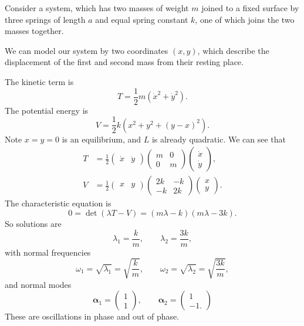 \documentclass[12pt]{article}
\begin{document}
\begin{exbox}
	Consider a system, which has two masses of weight $m$ joined to a fixed surface by three springs of length $a$ and equal spring constant $k$, one of which joins the two masses together.

	We can model our system by two coordinates $(x, y)$, which describe the displacement of the first and second mass from their resting place.

	The kinetic term is
	\[
	T = \frac{1}{2} m(\dot x^2 + \dot y^2).
	\]
	The potential energy is
	\[
	V = \frac{1}{2}k(x^2 + y^2 + (y-x)^2).
	\]
	Note $x = y = 0$ is an equilibrium, and $L$ is already quadratic. We can see that
	\begin{align*}
		T &= \frac{1}{2}
		\begin{pmatrix}
			\dot x & \dot y
		\end{pmatrix}
		\begin{pmatrix}
			m & 0\\
			 0 & m
		\end{pmatrix}
		\begin{pmatrix}
			\dot x \\ \dot y
		\end{pmatrix},\\
		V &= \frac{1}{2}
		\begin{pmatrix}
			x & y
		\end{pmatrix}
		\begin{pmatrix}
			2k & -k \\
			-k & 2k
		\end{pmatrix}
		\begin{pmatrix}
			x \\ y
		\end{pmatrix}.
	\end{align*}
	The characteristic equation is
	\[
	0 = \det (\lambda T - V) = (m \lambda - k)(m\lambda - 3k).
	\]
	So solutions are
	\[
		\lambda_1 = \frac{k}{m}, \qquad \lambda_2 = \frac{3k}{m},
	\]
	with normal frequencies
	\[
		\omega_1 = \sqrt{\lambda_1} = \sqrt{\frac{k}{m}}, \qquad \omega_2 = \sqrt{\lambda_2} = \sqrt{\frac{3k}{m}},
	\]
	and normal modes
	\[
	\bm{\alpha}_1 =
	\begin{pmatrix}
		1 \\ 1
	\end{pmatrix},
	\qquad
	\bm{\alpha}_2 =
	\begin{pmatrix}
		1 \\ -1.
	\end{pmatrix}
	\]
	These are oscillations in phase and out of phase.
\end{exbox}
\end{document}
